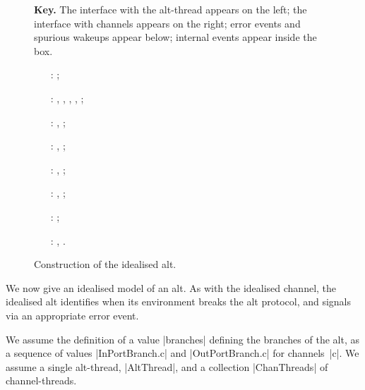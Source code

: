 \begin{figure}

\textbf{Key.} The interface with the alt-thread appears on the left; the
interface with channels appears on the right; error events and spurious
wakeups appear below; internal events appear inside the box.  

\raggedright
%
\begin{itemize}
\item[\inCircle{1}:] \m{};

\item[\inCircle{2}:] , ,
  \m{}, ,
  ; 

\item[\inCircle{3}:] \m{}, ;

\item[\inCircle{4}:] \m{}\m{},
  \m{}; 

\item[\inCircle{5}:] \m{},
  \m{};   

\item[\inCircle{6}:] \m{},
  \m{};   

\item[\inCircle{7}:] ; 

\item[\inCircle{8}:] \m{}, 
  .

\end{itemize}
%
\caption{Construction of the idealised alt.  \label{fig:idealised-alt}}
\end{figure}


We now give an idealised model of an alt.  As with the idealised channel, the
idealised alt identifies when its environment breaks the alt protocol, and
signals via an appropriate error event.  

We assume the definition of a value |branches| defining the branches of the
alt, as a sequence of values |InPortBranch.c| and |OutPortBranch.c| for
channels~|c|.  We assume a single alt-thread, |AltThread|, and a collection
|ChanThreads| of channel-threads.

